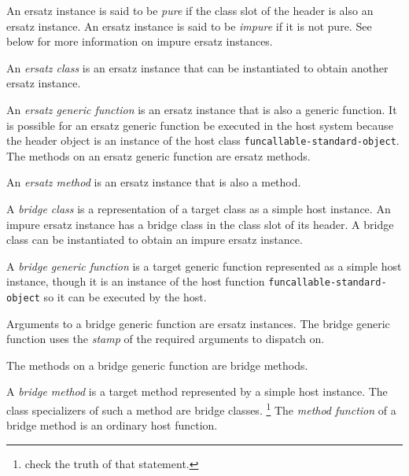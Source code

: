 \begin{definition}
An ersatz instance is said to be \emph{pure} if the class slot of the
header is also an ersatz instance.  An ersatz instance is said to be
\emph{impure} if it is not pure.  See below for more information on
impure ersatz instances.
\end{definition}

\begin{definition}
An \emph{ersatz class} is an ersatz instance that can be instantiated
to obtain another ersatz instance.
\end{definition}

\begin{definition}
An \emph{ersatz generic function} is an ersatz instance that is also a
generic function.  It is possible for an ersatz generic function be
executed in the host system because the header object is an instance
of the host class \texttt{funcallable-standard-object}.  The methods
on an ersatz generic function are ersatz methods.
\end{definition}

\begin{definition}
An \emph{ersatz method} is an ersatz instance that is also a method.
\end{definition}

\begin{definition}
A \emph{bridge class} is a representation of a target class as a
simple host instance.  An impure ersatz instance has a bridge class in
the class slot of its header.  A bridge class can be instantiated to
obtain an impure ersatz instance.
\end{definition}

\begin{definition}
A \emph{bridge generic function} is a target generic function
represented as a simple host instance, though it is an instance of the
host function \texttt{funcallable-standard-object} so it can be
executed by the host.

Arguments to a bridge generic function are ersatz instances.  The
bridge generic function uses the
\emph{stamp}
 of
the required arguments to dispatch on.

The methods on a bridge generic function are bridge methods.
\end{definition}

\begin{definition}
A \emph{bridge method} is a target method represented by a simple host
instance.  The class specializers of such a method are bridge classes.%
\footnote{check the truth of that statement.}
The \emph{method function} of a bridge method is an ordinary host
function.
\end{definition}

